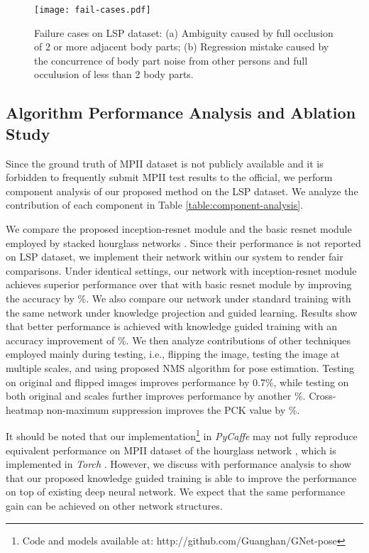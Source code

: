 \documentclass[journal ]{IEEEtran}
\begin{document}
\begin{figure*}[h]
	\begin{center}
		\texttt{[image: fail-cases.pdf]}
	\end{center}
	\caption{Failure cases on LSP dataset: (a) Ambiguity caused by full occlusion of 2 or more adjacent body parts; (b) Regression mistake caused by the concurrence of body part noise from other persons and full occulusion of less than 2 body parts. }
	\label{fig:fail-cases}
\end{figure*}


\subsection{Algorithm Performance Analysis and Ablation Study}
\label{sec:component-analysis}


Since the ground truth of MPII dataset is not publicly available and it is forbidden to frequently submit MPII test results to the official, we perform component analysis of our proposed method on the LSP dataset.
We analyze the contribution of each component in Table \ref{table:component-analysis}. 

We compare the proposed inception-resnet module and the basic resnet module employed by stacked hourglass networks \cite{newell2016stacked}. 
Since their performance is not reported on LSP dataset, we implement their network within our system to render fair comparisons.
Under identical settings, our network with inception-resnet module achieves superior performance over that with basic resnet module by improving the accuracy by \%. 
We also compare our network under standard training with the same network under knowledge projection and guided learning. Results show that better performance is achieved with knowledge guided training with an accuracy improvement of \%.
We then analyze contributions of other techniques employed mainly during testing, i.e., flipping the image, testing the image at multiple scales, and using proposed NMS algorithm for pose estimation. 
Testing on original and flipped images improves performance by 0.7\%, while testing on both original and  scales further improves performance by another \%. Cross-heatmap non-maximum suppression improves the PCK value by \%.


It should be noted that our implementation\footnote{Code and models available at: http://github.com/Guanghan/GNet-pose}  in \textit{PyCaffe} \cite{jia2014caffe} may not fully reproduce equivalent performance on MPII dataset of the hourglass network \cite{newell2016stacked}, which is implemented in \textit{Torch} \cite{torch}. 
However, we discuss with performance analysis to show that our proposed knowledge guided training is able to improve the performance on top of existing deep neural network. We expect that the same performance gain can be achieved on other network structures. 
\end{document}
